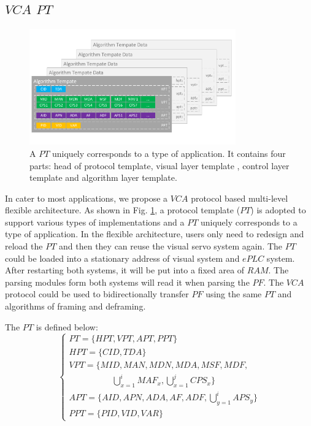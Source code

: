 \documentclass[journal,UTF8]{IEEEtran}
\begin{document}
\subsection{$VCA$ $PT$}
\begin{figure}
\centering
\includegraphics[width=3.5in]{fig/PT.pdf}
\caption{A $PT$ uniquely corresponds to a type of application. It contains four parts: head of protocol template, visual layer template , control layer template and algorithm layer template.}
\label{fig:PT}
\end{figure}
In cater to most applications, we propose a $VCA$ protocol based multi-level flexible architecture. As shown in Fig. \ref{fig:PT}, a protocol template ($PT$) is adopted to support various types of implementations and a $PT$ uniquely corresponds to a type of application. In the flexible architecture, users only need to redesign and reload the $PT$ and then they can reuse the visual servo system again. The $PT$ could be loaded into a stationary address of visual system and $ePLC$ system. After restarting both systems, it will be put into a fixed area of $RAM$. The parsing modules form both systems will read it when parsing the $PF$. The $VCA$ protocol could be used to bidirectionally transfer $PF$ using the same $PT$ and algorithms of framing and deframing.  
 
 The $PT$ is defined below:
  \begin{equation}
 \left\{
 \begin{array}{l}
 PT = \{HPT, VPT, APT, PPT\}\\
 HPT = \{CID, TDA\}\\
 VPT = \{MID, MAN, MDN, MDA, MSF, MDF, \\
 \qquad\qquad\quad \bigcup_{x=1}^i MAF_x, \bigcup_{x=1}^j CPS_x\}\\
 APT = \{AID, APN, ADA, AF, ADF, \bigcup_{y=1}^i APS_y\}\\
 PPT = \{PID, VID, VAR\}
 \end{array}
 \right.
 \end{equation}
 
\end{document}
